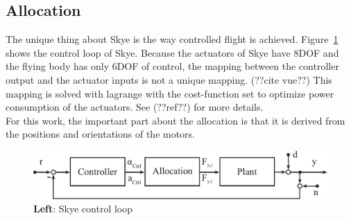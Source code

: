 \subsection{Allocation}
The unique thing about Skye is the way controlled flight is achieved. 
Figure~\ref{fig:system_loop_3} shows the control loop of Skye.
Because the actuators of Skye have 8DOF and the flying body has only 6DOF of control, the mapping between the controller output and the actuator inputs is not a unique mapping. (??cite vue??)
This mapping is solved with lagrange with the cost-function set to optimize power consumption of the actuators. See (??ref??) for more details.\\
For this work, the important part about the allocation is that it is derived from the positions and orientations of the motors.

\begin{figure}[hbtp]
\label{fig:system_loop_3}
\centering
\includegraphics[width=.9\linewidth]{images/system_loop_3.pdf}
\caption{\textbf{Left}: Skye control loop}
\end{figure}

